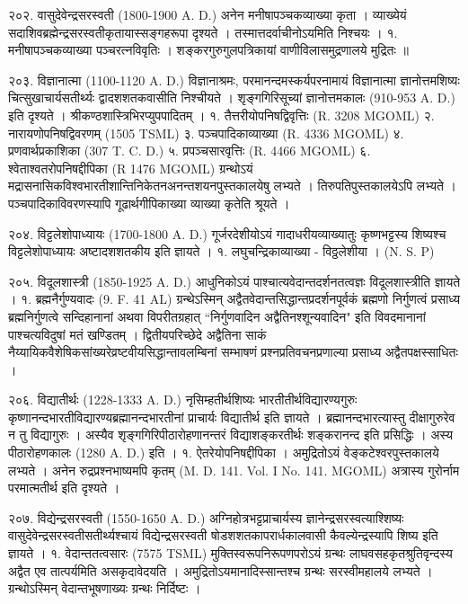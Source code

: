 २०२. वासुदेवेन्द्रसरस्वती (1800-1900 A. D.)
अनेन मनीषापञ्चकव्याख्या कृता । व्याख्येयं सदाशिवब्रह्मेन्द्रसरस्वतीकृतायास्सङ्गहरूपा दृश्यते । तस्मात्तदर्वाचीनोऽयमिति निश्चयः ।
१. मनीषापञ्चकव्याख्या पञ्चरत्नविवृतिः । शङ्करगुरुगुलपत्रिकायां वाणीविलासमुद्रणालये मुद्रितः ॥

२०३. विज्ञानात्मा (1100-1120 A. D.)
विज्ञानाश्रमः, परमानन्दमस्कर्यपरनामायं विज्ञानात्मा ज्ञानोत्तमशिष्यः चित्सुखाचार्यसतीर्थ्यः द्वादशशतकवासीति निश्चीयते । शृङ्गगिरिसूच्यां ज्ञानोत्तमकालः (910-953 A. D.) इति दृश्यते । श्रीकण्ठशास्त्रिभिरप्युपपादितम् ।
१. तैत्तरीयोपनिषद्विवृत्तिः (R. 3208 MGOML)
२. नारायणोपनिषद्विवरणम् (1505 TSML)
३. पञ्चपादिकाव्याख्या (R. 4336 MGOML)
४. प्रणवार्थप्रकाशिका (307 T. C. D.)
५. प्रपञ्चसारवृत्तिः (R. 4466 MGOML)
६. श्वेताश्वतरोपनिषद्दीपिका (R 1476 MGOML)
ग्रन्थोऽयं मद्रासनासिकविश्वभारतीशान्तिनिकेतनअनन्तशयनपुस्तकालयेषु लभ्यते । तिरुपतिपुस्तकालयेऽपि लभ्यते । पञ्चपादिकाविवरणस्यापि गूढार्थगीपिकाख्या व्याख्या कृतेति श्रूयते ।

२०४. विट्टलेशोपाध्यायः (1700-1800 A. D.)
गूर्जरदेशीयोऽयं गादाधरीयव्याख्यातुः कृष्णभट्टस्य शिष्यश्च विट्टलेशोपाध्यायः अष्टादशशतकीय इति ज्ञायते ।
१. लघुचन्द्रिकाव्याख्या - विठ्ठलेशीया । (N. S. P)

२०५. विदूलशास्त्री (1850-1925 A. D.)
आधुनिकोऽयं पाश्चात्यवेदान्तदर्शनतत्वज्ञः विदूलशास्त्रीति ज्ञायते ।
१. ब्रह्मनैर्गुण्यवादः (9. F. 41 AL)
ग्रन्थेऽस्मिन् अद्वैतवेदान्तसिद्धान्तप्रदर्शनपूर्वकं ब्रह्मणो निर्गुणत्वं प्रसाध्य ब्रह्मनिर्गुणत्वे सन्दिहानानां अथवा विपरीतग्रहात् ``निर्गुणवादिन अद्वैतिनश्शून्यवादिन" इति विवदमानानां पाश्चत्यविदुषां मतं खण्डितम् । द्वितीयपरिच्छेदे अद्वैतिना साकं नैय्यायिकवैशेषिकसांख्यरेव्रष्टवीयसिद्धान्तावलम्बिनां सम्भाषणं प्रश्नप्रतिवचनप्रणाल्या प्रसाध्य अद्वैतपक्षस्साधितः ।

२०६. विद्यातीर्थः (1228-1333 A. D.)
नृसिम्हतीर्थशिष्यः भारतीतीर्थविद्यारण्यगुरुः कृष्णानन्दभारतीविद्यारण्यब्रह्मानन्दभारतीनां प्राचार्यः विद्यातीर्थ इति ज्ञायते । ब्रह्मानन्दभारत्यास्तु दीक्षागुरुरेव न तु विद्यागुरुः । अस्यैव शृङ्गगिरिपीठारोहणानन्तरं विद्याशङ्करतीर्थः शङ्करानन्द इति प्रसिद्धिः । अस्य पीठारोहणकालः (1280 A. D.) इति ।
१. ऐतरेयोपनिषद्दीपिका । अमुद्रितोऽयं वेङ्कटेश्वरपुस्तकालये लभ्यते । अनेन रुद्रप्रश्नभाष्यमपि कृतम् (M. D. 141. Vol. I No. 141. MGOML) अत्रास्य गुरोर्नाम परमात्मतीर्थ इति दृश्यते ।

२०७. विद्येन्द्रसरस्वती (1550-1650 A. D.)
अग्निहोत्रभट्टप्राचार्यस्य ज्ञानेन्द्रसरस्वत्याश्शिष्यः वासुदेवेन्द्रसरस्वतीसतीर्थ्यश्चायं विद्येन्द्रसरस्वती षोडशशतकापरार्धकालवासी कैवल्येन्द्रस्यापि शिष्य इति ज्ञायते ।
१. वेदान्ततत्वसारः (7575 TSML)
मुक्तिस्वरूपनिरूपणपरोऽयं ग्रन्थः लाघवसहकृतश्रुतिवृन्दस्य अद्वैत एव तात्पर्यमिति असकृदावेदयति । अमुद्रितोऽयमानादिस्सान्तश्च ग्रन्थः सरस्वीमहालये लभ्यते । ग्रन्थोऽस्मिन् वेदान्तभूषणाख्यः ग्रन्थः निर्दिष्टः ।

